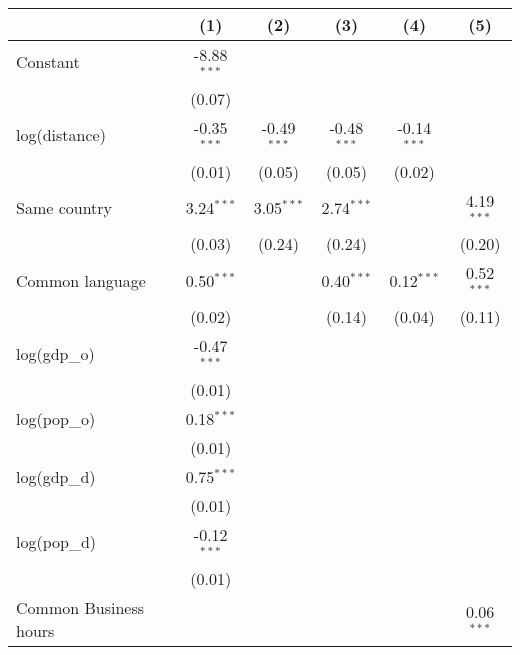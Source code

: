 
\begingroup
\centering
\small
\begin{tabular}{lccccc}
   \toprule
                            & (1)           & (2)           & (3)           & (4)           & (5)\\  
   \midrule 
   Constant                 & -8.88$^{***}$ &               &               &               &   \\   
                            & (0.07)        &               &               &               &   \\   
   log(distance)            & -0.35$^{***}$ & -0.49$^{***}$ & -0.48$^{***}$ & -0.14$^{***}$ &   \\   
                            & (0.01)        & (0.05)        & (0.05)        & (0.02)        &   \\   
   Same country             & 3.24$^{***}$  & 3.05$^{***}$  & 2.74$^{***}$  &               & 4.19$^{***}$\\   
                            & (0.03)        & (0.24)        & (0.24)        &               & (0.20)\\   
   Common language          & 0.50$^{***}$  &               & 0.40$^{***}$  & 0.12$^{***}$  & 0.52$^{***}$\\   
                            & (0.02)        &               & (0.14)        & (0.04)        & (0.11)\\   
   log(gdp\_o)              & -0.47$^{***}$ &               &               &               &   \\   
                            & (0.01)        &               &               &               &   \\   
   log(pop\_o)              & 0.18$^{***}$  &               &               &               &   \\   
                            & (0.01)        &               &               &               &   \\   
   log(gdp\_d)              & 0.75$^{***}$  &               &               &               &   \\   
                            & (0.01)        &               &               &               &   \\   
   log(pop\_d)              & -0.12$^{***}$ &               &               &               &   \\   
                            & (0.01)        &               &               &               &   \\   
   Common Business hours    &               &               &               &               & 0.06$^{***}$\\   

\end{tabular}
